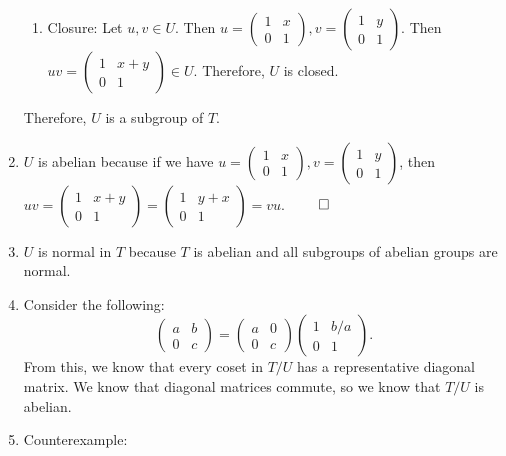 \documentclass[12pt]{report}
\begin{document}
\begin{enumerate}[label=\alph*.]
\begin{enumerate}
        \item Closure: Let $u,v \in U$. Then $u = \begin{pmatrix}
            1 & x \\
            0 & 1 \end{pmatrix}, v = \begin{pmatrix}
            1 & y \\
            0 & 1 \end{pmatrix}$. Then $uv = \begin{pmatrix}
            1 & x + y \\
            0 & 1 \end{pmatrix} \in U$. Therefore, $U$ is closed.
    \end{enumerate}
    Therefore, $U$ is a subgroup of $T$.
    \item $U$ is abelian because if we have $u = \begin{pmatrix}
        1 & x \\
        0 & 1 \end{pmatrix}, v = \begin{pmatrix}
        1 & y \\
        0 & 1 \end{pmatrix}$, then $uv = \begin{pmatrix}
        1 & x + y \\
        0 & 1 \end{pmatrix} = \begin{pmatrix}
        1 & y + x \\
        0 & 1 \end{pmatrix} = vu$. $\qed$
    \item $U$ is normal in $T$ because $T$ is abelian and all subgroups of abelian groups are normal.
    \item Consider the following:
    $$\begin{pmatrix}
        a & b \\
        0 & c
    \end{pmatrix} = \begin{pmatrix}
        a & 0 \\ 0 & c \end{pmatrix} \begin{pmatrix} 1 & b/a \\ 0 & 1 \end{pmatrix}.$$
        From this, we know that every coset in $T/U$ has a representative diagonal matrix. We know that diagonal matrices commute, so we know that $T/U$ is abelian.
    \item Counterexample:

\end{enumerate}
\end{document}
